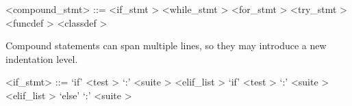 \label{compoundzzzstmtb}

\begin{grammar}
<compound_stmt> ::= <if_stmt \myref[ifzzzstmtb]>
	\alt <while_stmt \myref[whilezzzstmtb]>
	\alt <for_stmt \myref[forzzzstmtb]>
	\alt <try_stmt \myref[tryzzzstmtb]>
	\alt <funcdef \myref[funcdefb]>
	\alt <classdef \myref[classdefb]>
\end{grammar}


Compound statements can span multiple lines, so they may introduce a new indentation level.

\label{ifzzzstmtb}

\begin{grammar}
<if_stmt> ::= `if' <test \myref[testb]> `:' <suite \myref[suiteb]> <elif_list \myref[elifzzzlistb]>
	\alt `if' <test \myref[testb]> `:' <suite \myref[suiteb]> <elif_list \myref[elifzzzlistb]> `else' `:' <suite \myref[suiteb]>
\end{grammar}


